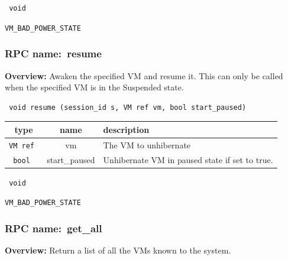 \vspace{0.3cm}

{\tt 
void
}



\vspace{0.3cm}

 {\tt VM\_BAD\_POWER\_STATE}

\vspace{0.6cm}
\subsubsection{RPC name:~resume}

{\bf Overview:} 
Awaken the specified VM and resume it.  This can only be called when the specified VM is in the Suspended state.

\begin{verbatim} void resume (session_id s, VM ref vm, bool start_paused)\end{verbatim}



 
\vspace{0.3cm}
\begin{tabular}{|c|c|p{7cm}|}
 \hline
{\bf type} & {\bf name} & {\bf description} \\ \hline
{\tt VM ref } & vm & The VM to unhibernate \\ \hline 

{\tt bool } & start\_paused & Unhibernate VM in paused state if set to true. \\ \hline 

\end{tabular}

\vspace{0.3cm}

{\tt 
void
}



\vspace{0.3cm}

 {\tt VM\_BAD\_POWER\_STATE}

\vspace{0.6cm}
\subsubsection{RPC name:~get\_all}

{\bf Overview:} 
Return a list of all the VMs known to the system.

